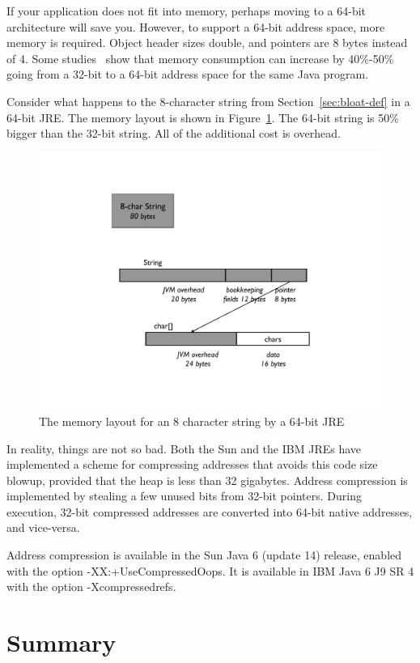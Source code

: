 If your application does not fit into memory, perhaps moving to a 64-bit architecture will save you. However, to support a 64-bit address space, more memory is required. Object header sizes double, and pointers are 8 bytes instead of 4. Some studies~\cite{compressedAddress} show that memory consumption can increase by 40\%-50\% going from a 32-bit to a 64-bit address space for the same Java program.
\begin{example} 
Consider what happens to the 8-character string from Section~\ref{sec:bloat-def} in a 64-bit JRE. The memory layout is shown in Figure~\ref{fig:8-char-string-64-bit}. The 64-bit string is 50\% bigger than the 32-bit string. All of the additional cost is overhead.

\end{example} 
 \begin{figure}
  \centering
 \includegraphics[width=.70\textwidth]{Figures/chapter4/8-char-string-64-bit.pdf}
  \caption{The memory layout for an 8 character string by a 64-bit JRE}
  \label{fig:8-char-string-64-bit}
\end{figure}

In reality, things are not so bad. Both the Sun and the IBM JREs have implemented a scheme for compressing addresses that avoids this code size blowup, provided that the heap is less than 32 gigabytes. Address compression is implemented by stealing a few unused bits from 32-bit pointers. During execution, 32-bit compressed addresses are converted into 64-bit native addresses, and vice-versa. 

Address compression is available in the Sun Java 6 (update 14) release, enabled with the option -XX:+UseCompressedOops. It is available in IBM Java 6 J9 SR 4 with the option -Xcompressedrefs.

\section{Summary}

